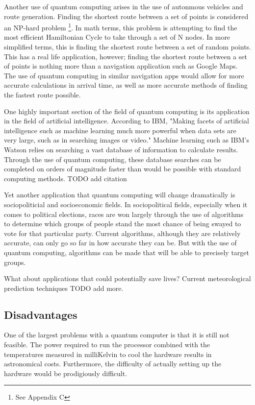 \documentclass[10pt,journal,compsoc]{IEEEtran}
\begin{document}
Another use of quantum computing arises in the use of autonmous vehicles and route generation. Finding the shortest route between a set of points is considered an NP-hard problem
\footnote{See Appendix C }.
In math terms, this problem is attempting to find the most efficient Hamiltonian Cycle to take through a set of N nodes. In more simplified terms, this is finding the shortest route between a set of random points. This has a real life application, however; finding the shortest route between a set of points is nothing more than a navigation application such as Google Maps. The use of quantum computing in similar navigation apps would allow for more accurate calculations in arrival time, as well as more accurate methods of finding the fastest route possible. 
 
One highly important section of the field of quantum computing is its application in the field of artificial intelligence. According to IBM, "Making facets of artificial intelligence such as machine learning much more powerful when data sets are very large, such as in searching images or video." Machine learning such as IBM's Watson relies on searching a vast database of information to calculate results. Through the use of quantum computing, these database searches can be completed on orders of magnitude faster than would be possible with standard computing methods. TODO add citation

Yet another application that quantum computing will change dramatically is sociopoliticial and socioeconomic fields. In sociopolitical fields, especially when it comes to political elections, races are won largely through the use of algorithms to determine which groups of people stand the most chance of being swayed to vote for that particular party. Current algorithms, although they are relatively accurate, can only go so far in how accurate they can be. But with the use of quantum computing, algorithms can be made that will be able to precisely target groups. 

What about applications that could potentially save lives? Current meteorological prediction techniques
 TODO add more. 
\subsection{Disadvantages}
One of the largest problems with a quantum computer is that it is still not feasible. The power required to run the processor combined with the temperatures measured in milliKelvin to cool the hardware results in astronomical costs. Furthermore, the difficulty of actually setting up the hardware would be prodigiously difficult. 
\end{document}
